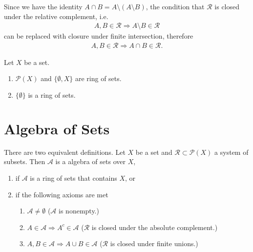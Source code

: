 %
\begin{remark}
    Since we have the identity \(A \cap B = A \setminus (A \setminus B)\), the condition that \(\mathcal{R}\) is closed under the relative complement, i.e.
    \begin{align}
        A, B \in \mathcal{R} \Rightarrow A \setminus B \in \mathcal{R}
    \end{align}
    can be replaced with closure under finite intersection, therefore
    \begin{align}
        A, B \in \mathcal{R} \Rightarrow A \cap B \in \mathcal{R} \text{.}
    \end{align}
\end{remark}
\begin{example}
    Let \(X\) be a set.
    \begin{enumerate}
        \item \(\mathcal{P}(X)\) and \(\{\emptyset, X\}\) are ring of sets.
        \item \(\{\emptyset\}\) is a ring of sets.
    \end{enumerate}
\end{example}
\section{Algebra of Sets}
\begin{definition}
    There are two equivalent definitions. Let {\color{mathif}\(X\)} be a {\color{mathif}set} and {\color{mathif}\(\mathcal{R} \subset \mathcal{P}(X)\)} a {\color{mathif}system of subsets}. Then {\color{maththen} \(\mathcal{A}\)}  is a {\color{maththen}algebra of sets over \(X\)},
    \begin{enumerate}
        \item if \(\mathcal{A}\) is a {\color{mathif}ring of sets} that contains {\color{mathif}\(X\)}, or
        \item if the following axioms are met
        \begin{enumerate}
            \item \(\mathcal{A} \neq \emptyset\) (\(\mathcal{A}\) is {\color{mathrem}nonempty.})
            \item \(A \in \mathcal{A} \Rightarrow A^c \in \mathcal{A}\) (\(\mathcal{R}\) is {\color{mathrem}closed under the absolute complement}.)
            \item \(A, B \in \mathcal{A} \Rightarrow A \cup B \in \mathcal{A}\) (\(\mathcal{R}\) is {\color{mathrem}closed under finite unions}.)
        \end{enumerate}
    \end{enumerate}
\end{definition}
%
%
%
%
%
